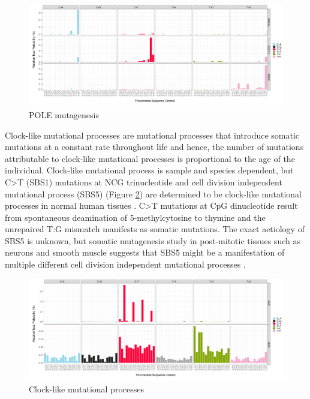 \begin{figure}[htbp!]
\caption{POLE mutagenesis}
\label{figure:pole-mutagenesis}
\begin{centering}
\includegraphics[width=\textwidth]{Vector/SBS10a_SBS10b_SBS28_sbs96.pdf}
\end{centering}
\end{figure}


Clock-like mutational processes are mutational processes that introduce somatic mutations at a constant rate throughout life and hence, the number of mutations attributable to clock-like mutational processes is proportional to the age of the individual. Clock-like mutational process is sample and species dependent, but C>T (SBS1) mutations at NCG trinucleotide and cell division independent mutational process (SBS5) (Figure \ref{figure:clock-like-mutagenesis}) are determined to be clock-like mutational processes in normal human tissues \cite{Alexandrov2015-db}. C>T mutations at CpG dinucleotide result from spontaneous deamination of 5-methylcytosine to thymine and the unrepaired T:G mismatch manifests as somatic mutations. The exact aetiology of SBS5 is unknown, but somatic mutagenesis study in post-mitotic tissues such as neurons and smooth muscle suggests that SBS5 might be a manifestation of multiple different cell division independent mutational processes \cite{Abascal2021-pk}.

\begin{figure}[htbp!]
\caption{Clock-like mutational processes}
\label{figure:clock-like-mutagenesis}
\begin{centering}
\includegraphics[width=\textwidth]{Vector/SBS1_SBS5_sbs96.pdf}
\end{centering}
\end{figure}

